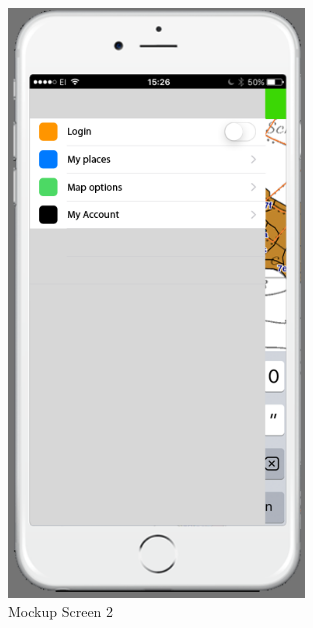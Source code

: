 \begin{figure}[h]
\centering
    \includegraphics[width=0.7\textwidth]{mockup1-2}
    \caption{Mockup Screen 2}
    \label{fig:mesh2}
\end{figure}


